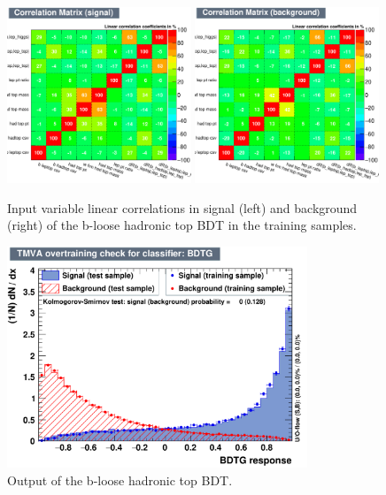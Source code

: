\begin{figure}[hbtp]
 \begin{center}
   \includegraphics[width=0.49\textwidth]{ch8_figs/recoBdt_bloose/CorrelationMatrixS.pdf}
   \includegraphics[width=0.49\textwidth]{ch8_figs/recoBdt_bloose/CorrelationMatrixB.pdf}
   \caption[Input variable linear correlations of the b-loose hadronic top BDT]{Input variable linear correlations in signal (left) and background (right)
     of the b-loose hadronic top BDT in the training samples.}
   \label{fig:recoBdt_b_loose_corrMatrix}
 \end{center}
\end{figure}

\begin{figure}[hbtp]
 \begin{center}
   \includegraphics[width=0.8\textwidth]{ch8_figs/recoBdt_bloose/overtrain_BDTG.pdf}
   \caption[Output of the b-loose hadronic top BDT]{Output of the b-loose hadronic top BDT.}
   \label{fig:recoBdt_bloose_score}
 \end{center}
\end{figure}


